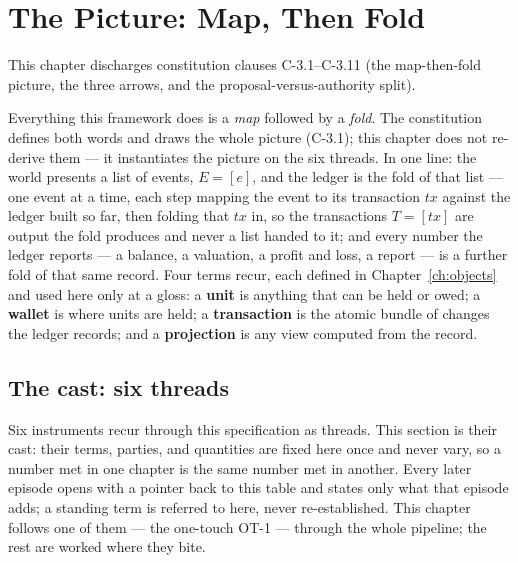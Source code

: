 \section{The Picture: Map, Then Fold}\label{ch:picture}

This chapter discharges constitution clauses C-3.1--C-3.11 (the map-then-fold picture, the three arrows, and the proposal-versus-authority split).

Everything this framework does is a \emph{map} followed by a \emph{fold}. The
constitution defines both words and draws the whole picture (C-3.1); this chapter does
not re-derive them --- it instantiates the picture on the six threads. In one line: the
world presents a list of events, $E = [e]$, and the ledger is the fold of that list ---
one event at a time, each step mapping the event to its transaction $tx$ against the
ledger built so far, then folding that $tx$ in, so the transactions $T = [tx]$ are output
the fold produces and never a list handed to it; and every number the ledger reports ---
a balance, a valuation, a profit and loss, a report --- is a further fold of that same
record. Four terms recur, each defined in Chapter~\ref{ch:objects} and used here
only at a gloss: a \textbf{unit} is anything that can be held or owed; a \textbf{wallet}
is where units are held; a \textbf{transaction} is the atomic bundle of changes the
ledger records; and a \textbf{projection} is any view computed from the record.

\subsection{The cast: six threads}\label{sec:cast}

Six instruments recur through this specification as threads. This section is their cast:
their terms, parties, and quantities are fixed here once and never vary, so a number met in
one chapter is the same number met in another. Every later episode opens with a pointer back
to this table and states only what that episode adds; a standing term is referred to here,
never re-established. This chapter follows one of them --- the one-touch OT-1 --- through the
whole pipeline; the rest are worked where they bite.

